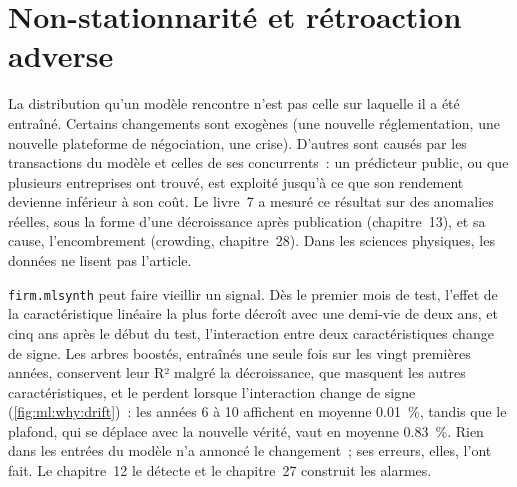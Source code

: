 \begin{omfigure}

\label{fig:ml:why:months}
\end{omfigure}

\section{Non-stationnarité et rétroaction adverse}

La distribution qu'un modèle rencontre n'est pas celle sur laquelle il a été entraîné. Certains changements sont exogènes (une nouvelle réglementation, une nouvelle
plateforme de négociation, une crise). D'autres sont causés par les transactions du modèle et celles de ses concurrents~: un prédicteur public, ou que
plusieurs entreprises ont trouvé, est exploité jusqu'à ce que son rendement devienne inférieur à son coût. Le livre~7 a mesuré ce résultat sur des anomalies réelles,
sous la forme d'une décroissance après publication (chapitre~13), et sa cause, l'encombrement (crowding, chapitre~28). Dans les sciences physiques, les
données ne lisent pas l'article.

\texttt{firm.mlsynth} peut faire vieillir un signal. Dès le premier mois de test, l'effet de la caractéristique linéaire la plus forte décroît
avec une demi-vie de deux ans, et cinq ans après le début du test, l'interaction entre deux caractéristiques change de signe.
Les arbres boostés, entraînés une seule fois sur les vingt premières années, conservent leur R² malgré la décroissance, que
masquent les autres caractéristiques, et le perdent lorsque l'interaction change de signe (\cref{fig:ml:why:drift})~: les années 6 à 10 affichent en moyenne
0.01~\%, tandis que le plafond, qui se déplace avec la nouvelle vérité, vaut en moyenne 0.83~\%. Rien dans les entrées du modèle n'a annoncé
le changement~; ses erreurs, elles, l'ont fait. Le chapitre~12 le détecte et
le chapitre~27 construit les alarmes.

